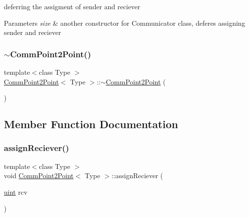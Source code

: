 deferring the assigment of sender and reciever 
\begin{DoxyParams}{Parameters}
{\em size} & another constructor for Communicator class, deferes assigning sender and reciever \\
\hline
\end{DoxyParams}
\mbox{\label{classCommPoint2Point_ad2f7721e07287b51cf589d03c1165966}} 
\subsubsection{\texorpdfstring{$\sim$\+Comm\+Point2\+Point()}{~CommPoint2Point()}}
{\footnotesize\ttfamily template$<$class Type $>$ \\
\mbox{\hyperlink{classCommPoint2Point}{Comm\+Point2\+Point}}$<$ Type $>$\+::$\sim$\mbox{\hyperlink{classCommPoint2Point}{Comm\+Point2\+Point}} (\begin{DoxyParamCaption}{ }\end{DoxyParamCaption})\hspace{0.3cm}{\ttfamily [inline]}}



\subsection{Member Function Documentation}
\mbox{\label{classCommPoint2Point_a0b5ed7ad903ab51aa0429e54bcf6d58e}} 
\subsubsection{\texorpdfstring{assign\+Reciever()}{assignReciever()}}
{\footnotesize\ttfamily template$<$class Type $>$ \\
void \mbox{\hyperlink{classCommPoint2Point}{Comm\+Point2\+Point}}$<$ Type $>$\+::assign\+Reciever (\begin{DoxyParamCaption}\item[{\mbox{\hyperlink{definitions_8h_a69aa29b598b851b0640aa225a9e5d61d}{uint}}}]{rcv }\end{DoxyParamCaption})}

